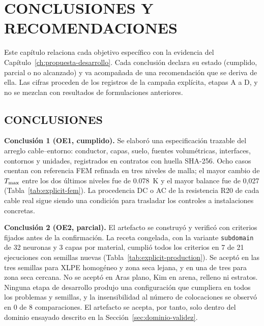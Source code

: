 \chapter{CONCLUSIONES Y RECOMENDACIONES}

\label{ch:conclusiones}
\thispagestyle{empty}

Este capítulo relaciona cada objetivo específico con la evidencia del Capítulo~\ref{ch:propuesta-desarrollo}. Cada conclusión declara su estado (cumplido, parcial o no alcanzado) y va acompañada de una recomendación que se deriva de ella. Las cifras proceden de los registros de la campaña explícita, etapas A a D, y no se mezclan con resultados de formulaciones anteriores.

\section{CONCLUSIONES}

\textbf{Conclusión 1 (OE1, cumplido).} Se elaboró una especificación trazable del arreglo cable--entorno: conductor, capas, suelo, fuentes volumétricas, interfaces, contornos y unidades, registrados en contratos con huella SHA-256. Ocho casos cuentan con referencia FEM refinada en tres niveles de malla; el mayor cambio de $T_{\max}$ entre los dos últimos niveles fue de \SI{0,078}{\kelvin} y el mayor balance fue de 0,027\,\pct{} (Tabla~\ref{tab:explicit-fem}). La procedencia DC o AC de la resistencia R20 de cada cable real sigue siendo una condición para trasladar los controles a instalaciones concretas.

\textbf{Conclusión 2 (OE2, parcial).} El artefacto se construyó y verificó con criterios fijados antes de la confirmación. La receta congelada, con la variante \texttt{subdomain} de 32 neuronas y 3 capas por material, cumplió todos los criterios en 7 de 21 ejecuciones con semillas nuevas (Tabla~\ref{tab:explicit-production}). Se aceptó en las tres semillas para XLPE homogéneo y zona seca lejana, y en una de tres para zona seca cercana. No se aceptó en Aras plano, Kim en arena, relleno ni estratos. Ninguna etapa de desarrollo produjo una configuración que cumpliera en todos los problemas y semillas, y la insensibilidad al número de colocaciones se observó en 0 de 8 comparaciones. El artefacto se acepta, por tanto, solo dentro del dominio ensayado descrito en la Sección~\ref{sec:dominio-validez}.

